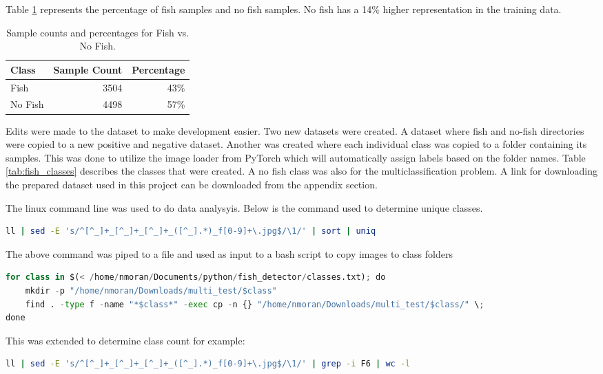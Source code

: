 Table \ref{tab:fish_no_fish} represents the percentage of fish samples and no fish samples. No fish has a 14\% higher representation in the training data.  

\begin{table}[!ht]
    \centering
    \begin{tabular}{lrr}
        \hline
        Class  & Sample Count & Percentage \\
        \hline
        Fish    & 3504 & 43\% \\
        No Fish & 4498 & 57\% \\
        \hline
    \end{tabular}
    \caption{Sample counts and percentages for Fish vs. No Fish.}
    \label{tab:fish_no_fish}
\end{table}


Edits were made to the dataset to make development easier. Two new datasets were created. A dataset where fish and no-fish directories were copied to a new positive and negative dataset. Another was created where each individual class was copied to a folder containing its samples. This was done to utilize the image loader from PyTorch which will automatically assign labels based on the folder names. Table \ref{tab:fish_classes} describes the classes that were created. A no fish class was also
for the multiclassification problem.
A link for downloading the prepared dataset used in this project can be downloaded from the appendix section.

The linux command line was used to do data analysyis. Below is the command used to determine unique classes.

\begin{lstlisting}[language=bash]
ll | sed -E 's/^[^_]+_[^_]+_[^_]+_([^_].*)_f[0-9]+\.jpg$/\1/' | sort | uniq
\end{lstlisting}

The above command was piped to a file and used as input to a bash script to copy images to class folders

\begin{lstlisting}[language=python]
for class in $(< /home/nmoran/Documents/python/fish_detector/classes.txt); do
    mkdir -p "/home/nmoran/Downloads/multi_test/$class"
    find . -type f -name "*$class*" -exec cp -n {} "/home/nmoran/Downloads/multi_test/$class/" \;
done
\end{lstlisting}

This was extended to determine class count for example:


\begin{lstlisting}[language=bash]
ll | sed -E 's/^[^_]+_[^_]+_[^_]+_([^_].*)_f[0-9]+\.jpg$/\1/' | grep -i F6 | wc -l
\end{lstlisting}


